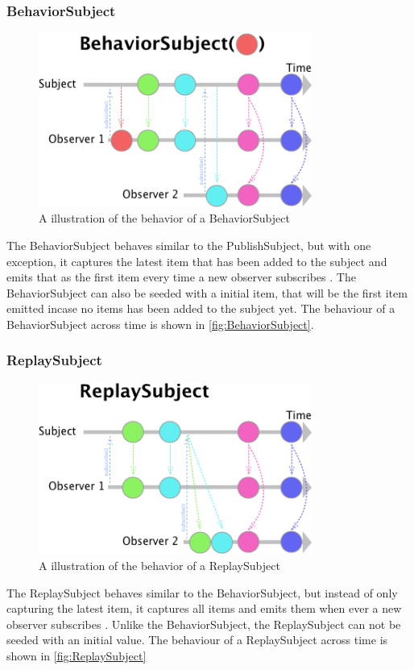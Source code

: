 \subsubsection*{BehaviorSubject}
\begin{figure}[h]
    \centering
    \includegraphics[width=0.8\textwidth]{figures/BehaviorSubject.png}
    \caption{A illustration of the behavior of a BehaviorSubject}
    \label{fig:BehaviorSubject}
\end{figure}
The BehaviorSubject behaves similar to the PublishSubject, but with one exception, it captures the latest item that has been added to the subject and emits that as the first item every time a new observer subscribes \cite{BehaviorSubject}. The BehaviorSubject can also be seeded with a initial item, that will be the first item emitted incase no items has been added to the subject yet. The behaviour of a BehaviorSubject across time is shown in \autoref{fig:BehaviorSubject}.

\subsubsection*{ReplaySubject}
\begin{figure}[h]
    \centering
    \includegraphics[width=0.8\textwidth]{figures/ReplaySubject.png}
    \caption{A illustration of the behavior of a ReplaySubject}
    \label{fig:ReplaySubject}
\end{figure}
The ReplaySubject behaves similar to the BehaviorSubject, but instead of only capturing the latest item, it captures all items and emits them when ever a new observer subscribes \cite{ReplaySubject}. Unlike the BehaviorSubject, the ReplaySubject can not be seeded with an initial value. The behaviour of a ReplaySubject across time is shown in \autoref{fig:ReplaySubject}


